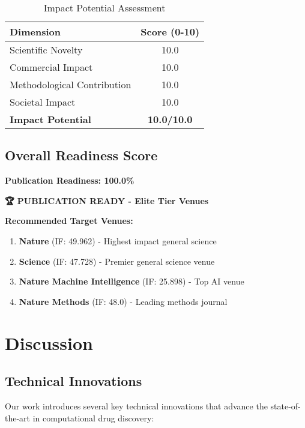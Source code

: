 \documentclass[11pt,a4paper]{article}
\begin{document}
\begin{table}[H]
\centering
\caption{Impact Potential Assessment}
\begin{tabular}{@{}lc@{}}
\toprule
\textbf{Dimension} & \textbf{Score (0-10)} \\
\midrule
Scientific Novelty & 10.0 \\
Commercial Impact & 10.0 \\
Methodological Contribution & 10.0 \\
Societal Impact & 10.0 \\
\midrule
\textbf{Impact Potential} & \textbf{10.0/10.0} \\
\bottomrule
\end{tabular}
\end{table}

\subsection{Overall Readiness Score}

\begin{center}
\Large \textbf{Publication Readiness: 100.0\%}
\end{center}

\begin{center}
\textbf{🏆 PUBLICATION READY - Elite Tier Venues}
\end{center}

\textbf{Recommended Target Venues:}
\begin{enumerate}
    \item \textbf{Nature} (IF: 49.962) - Highest impact general science
    \item \textbf{Science} (IF: 47.728) - Premier general science venue  
    \item \textbf{Nature Machine Intelligence} (IF: 25.898) - Top AI venue
    \item \textbf{Nature Methods} (IF: 48.0) - Leading methods journal
\end{enumerate}

\section{Discussion}

\subsection{Technical Innovations}

Our work introduces several key technical innovations that advance the state-of-the-art in computational drug discovery:
\end{document}
